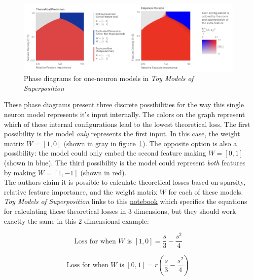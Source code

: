 \documentclass{article} %
\begin{document}
\begin{figure}[h]
    \centering
    \includegraphics[width=0.99\linewidth]{phase_changes/images/phase_changes_anthropic.png}
    \captionsetup{font=footnotesize, width=0.75\linewidth} %
    \caption{
        Phase diagrams for one-neuron models in 
        \textit{Toy Models of Superposition}\cite{elhage2022toy}
    }
    \label{fig:section4_anthropic}
\end{figure}

These phase diagrams present three discrete possibilities for the way this single
neuron model represents it's input internally. The colors on the graph represent
which of these internal configurations lead to the lowest theoretical loss.
The first possibility is the model 
\textit{only} represents the first input. In this case, the weight matrix $W = [1, 0]$ (shown in
gray in figure~\ref{fig:section4_anthropic}). The opposite option is also a 
possibility: the model could only embed the second feature making $W = [0, 1]$ 
(shown in blue). The third possibility is the model could represent \textit{both}
features by making $W = [1, -1]$ (shown in red). \\

The authors claim it is possible to calculate theoretical losses based on sparsity,
relative feature importance, and the weight matrix $W$ for each of these models. 
\textit{Toy Models of Superposition} links to this 
\href{https://github.com/wattenberg/superposition/blob/main/Exploring_Exact_Toy_Models.ipynb}{notebook} 
which specifies the equations for calculating these theoretical losses in 3 
dimensions, but they should work exactly the same in this 2 dimensional example:

\begin{equation}
    \label{eq:loss1}
    \text{Loss for when  $W$ is $[1, 0]$} = \frac{s}{3} - \frac{s^2}{4}
\end{equation}

\begin{equation}
    \label{eq:loss2}
    \text{Loss for when  $W$ is $[0, 1]$} = r \left(\frac{s}{3} - \frac{s^2}{4}\right)
\end{equation}
\end{document}
